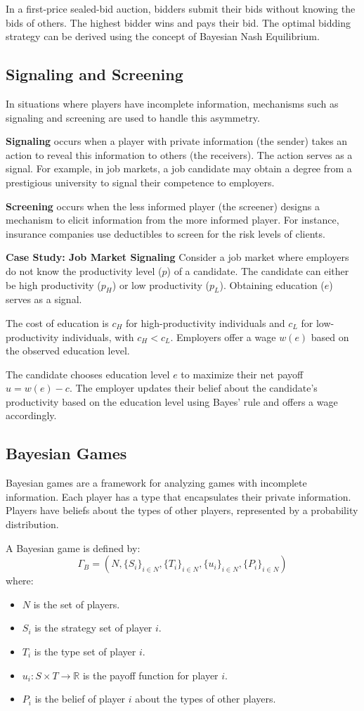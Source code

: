 \documentclass[12pt]{book} %
\begin{document}
In a first-price sealed-bid auction, bidders submit their bids without knowing the bids of others. The highest bidder wins and pays their bid. The optimal bidding strategy can be derived using the concept of Bayesian Nash Equilibrium.

\subsection{Signaling and Screening}
In situations where players have incomplete information, mechanisms such as signaling and screening are used to handle this asymmetry.

\textbf{Signaling} occurs when a player with private information (the sender) takes an action to reveal this information to others (the receivers). The action serves as a signal. For example, in job markets, a job candidate may obtain a degree from a prestigious university to signal their competence to employers.

\textbf{Screening} occurs when the less informed player (the screener) designs a mechanism to elicit information from the more informed player. For instance, insurance companies use deductibles to screen for the risk levels of clients.

\textbf{Case Study: Job Market Signaling}
Consider a job market where employers do not know the productivity level ($p$) of a candidate. The candidate can either be high productivity ($p_H$) or low productivity ($p_L$). Obtaining education ($e$) serves as a signal.

The cost of education is $c_H$ for high-productivity individuals and $c_L$ for low-productivity individuals, with $c_H < c_L$. Employers offer a wage $w(e)$ based on the observed education level.

The candidate chooses education level $e$ to maximize their net payoff $u = w(e) - c$. The employer updates their belief about the candidate's productivity based on the education level using Bayes' rule and offers a wage accordingly.

\subsection{Bayesian Games}
Bayesian games are a framework for analyzing games with incomplete information. Each player has a type that encapsulates their private information. Players have beliefs about the types of other players, represented by a probability distribution.

A Bayesian game is defined by:
\[ \Gamma_B = (N, \{S_i\}_{i \in N}, \{T_i\}_{i \in N}, \{u_i\}_{i \in N}, \{P_i\}_{i \in N}) \]
where:
\begin{itemize}
    \item $N$ is the set of players.
    \item $S_i$ is the strategy set of player $i$.
    \item $T_i$ is the type set of player $i$.
    \item $u_i: S \times T \to \mathbb{R}$ is the payoff function for player $i$.
    \item $P_i$ is the belief of player $i$ about the types of other players.
\end{itemize}
\end{document}
